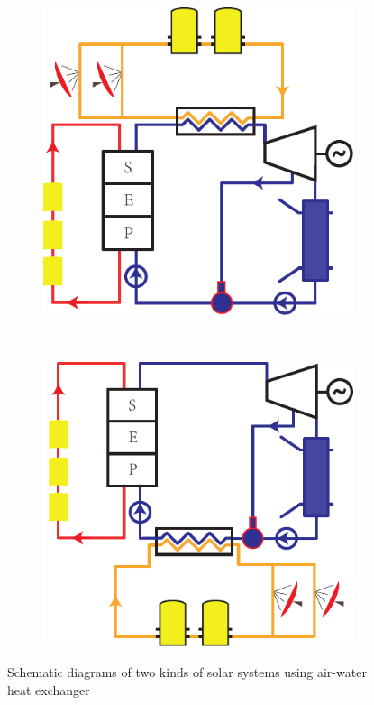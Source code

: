 \noindent \begin{figure}[htbp]
\centering
	\begin{subfigure}[b]{0.4\columnwidth}
	\includegraphics[width = \columnwidth]{fig/air-water1}
	\caption{}\label{fig:air-water_1_c}
	\end{subfigure}
	~
\begin{subfigure}[b]{0.4\columnwidth}
	\includegraphics[width = \columnwidth]{fig/air-water2}
	\caption{}\label{fig:air-water_2_c}
	\end{subfigure}
	\caption{Schematic diagrams of two kinds of solar systems using air-water heat exchanger}
	\label{fig:air-water_c}
\end{figure}

